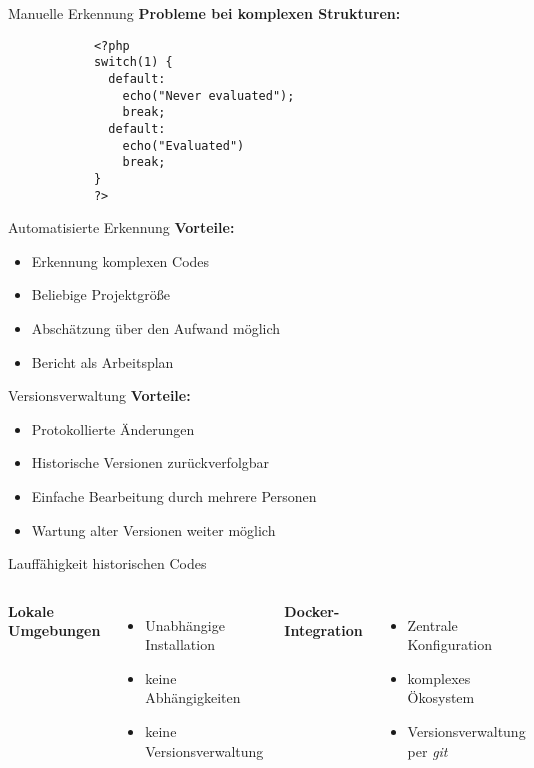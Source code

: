 
    \begin{frame}[fragile] {Manuelle Erkennung}
        \textbf{Probleme bei komplexen Strukturen:}
		\begin{lstlisting}
            <?php
            switch(1) {
              default:
                echo("Never evaluated");
                break;
              default:
                echo("Evaluated")
                break;
            }
            ?>
        \end{lstlisting}
    \end{frame}
    
    \begin{frame} {Automatisierte Erkennung}
        \textbf{Vorteile:}
        \begin{itemize}
            \item Erkennung komplexen Codes
            \item Beliebige Projektgröße
            \item Abschätzung über den Aufwand möglich
            \item Bericht als Arbeitsplan
        \end{itemize}
    \end{frame}

    \begin{frame} {Versionsverwaltung}
        \textbf{Vorteile:}
        \begin{itemize}
            \item Protokollierte Änderungen
            \item Historische Versionen zurückverfolgbar
            \item Einfache Bearbeitung durch mehrere Personen
            \item Wartung alter Versionen weiter möglich
        \end{itemize}
    \end{frame}
    
    \begin{frame} {Lauffähigkeit historischen Codes}
        \begin{columns}[T,onlytextwidth]
                \textbf{Lokale Umgebungen}
                \begin{itemize}
                    \item Unabhängige Installation
                    \item keine Abhängigkeiten
                    \item keine Versionsverwaltung
                \end{itemize}
                \textbf{Docker-Integration} \nocite{anderson_docker_2015}
                \begin{itemize}
                    \item Zentrale Konfiguration
                    \item komplexes Ökosystem
                    \item Versionsverwaltung per \emph{git}
                \end{itemize}
          \end{columns}
    \end{frame}
